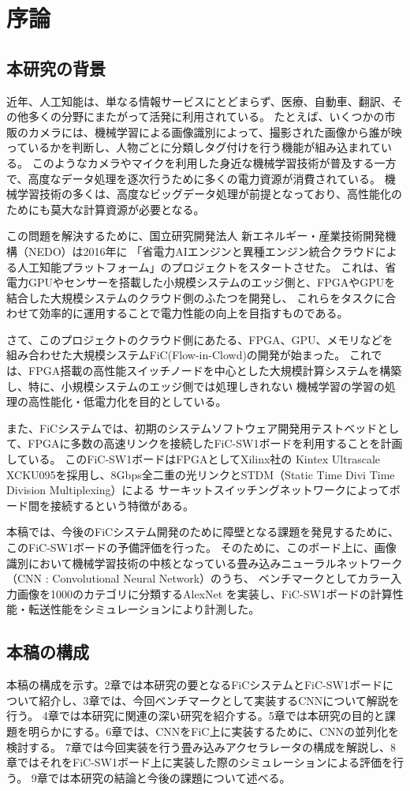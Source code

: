 \chapter{序論}
\section{本研究の背景}
近年、人工知能は、単なる情報サービスにとどまらず、医療、自動車、翻訳、その他多くの分野にまたがって活発に利用されている。
たとえば、いくつかの市販のカメラには、機械学習による画像識別によって、撮影された画像から誰が映っているかを判断し、人物ごとに分類しタグ付けを行う機能が組み込まれている。
このようなカメラやマイクを利用した身近な機械学習技術が普及する一方で、高度なデータ処理を逐次行うために多くの電力資源が消費されている。
機械学習技術の多くは、高度なビッグデータ処理が前提となっており、高性能化のためにも莫大な計算資源が必要となる。

この問題を解決するために、国立研究開発法人 新エネルギー・産業技術開発機構（NEDO）は2016年に
「省電力AIエンジンと異種エンジン統合クラウドによる人工知能プラットフォーム」のプロジェクトをスタートさせた。
これは、省電力GPUやセンサーを搭載した小規模システムのエッジ側と、FPGAやGPUを結合した大規模システムのクラウド側のふたつを開発し、
これらをタスクに合わせて効率的に運用することで電力性能の向上を目指すものである。

さて、このプロジェクトのクラウド側にあたる、FPGA、GPU、メモリなどを組み合わせた大規模システムFiC(Flow-in-Clowd)の開発が始まった。
これでは、FPGA搭載の高性能スイッチノードを中心とした大規模計算システムを構築し、特に、小規模システムのエッジ側では処理しきれない
機械学習の学習の処理の高性能化・低電力化を目的としている。

また、FiCシステムでは、初期のシステムソフトウェア開発用テストベッドとして、FPGAに多数の高速リンクを接続したFiC-SW1ボードを利用することを計画している。
このFiC-SW1ボードはFPGAとしてXilinx社の Kintex Ultrascale XCKU095を採用し、8Gbps全二重の光リンクとSTDM（Static Time Divi Time Division Multiplexing）による
サーキットスイッチングネットワークによってボード間を接続するという特徴がある。

本稿では、今後のFiCシステム開発のために障壁となる課題を発見するために、このFiC-SW1ボードの予備評価を行った。
そのために、このボード上に、画像識別において機械学習技術の中核となっている畳み込みニューラルネットワーク（CNN : Convolutional Neural Network）のうち、
ベンチマークとしてカラー入力画像を1000のカテゴリに分類するAlexNet \cite{alexnet}を実装し、FiC-SW1ボードの計算性能・転送性能をシミュレーションにより計測した。

\section{本稿の構成}
本稿の構成を示す。2章では本研究の要となるFiCシステムとFiC-SW1ボードについて紹介し、3章では、今回ベンチマークとして実装するCNNについて解説を行う。
4章では本研究に関連の深い研究を紹介する。5章では本研究の目的と課題を明らかにする。6章では、CNNをFiC上に実装するために、CNNの並列化を検討する。
7章では今回実装を行う畳み込みアクセラレータの構成を解説し、8章ではそれをFiC-SW1ボード上に実装した際のシミュレーションによる評価を行う。
9章では本研究の結論と今後の課題について述べる。
